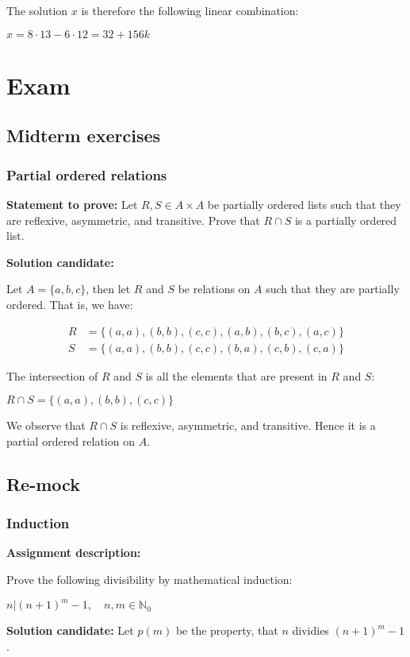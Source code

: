 \documentclass{report}
\newcommand{\cent}[1]{\begin{center}#1\end{center}}
\newcommand{\mAlign}[1]{\begin{align*}#1\end{align*}}
\newcommand{\doubleN}{\mathbb{N}}
\newcommand{\In}{\! \in \!}
\newcommand{\Prove}{\textbf{Statement to prove: }}
\newcommand{\assignmentDescription}{\textbf{Assignment description: }}
\newcommand{\solution}{\textbf{Solution candidate: }}
\begin{document}
 	The solution $x$ is therefore the following linear combination:
 	
 	\cent{$x = 8\cdot 13 - 6 \cdot 12 = 32 + 156k$}
 	
 	\chapter{Exam}
 	\pagebreak
	\section{Midterm exercises}
 	\subsection{Partial ordered relations}
	 
	\Prove
	Let $R,S\In A \times A$ be partially ordered lists such that they are reflexive, asymmetric, and transitive. Prove that $R\cap S$ is a partially ordered list.
	
	\solution
	 
	Let $A=\{a,b,c\}$, then let $R$ and $S$ be relations on $A$ such that they are partially ordered. That is, we have:
	 
	\mAlign{R&=\{(a,a),(b,b),(c,c),(a,b),(b,c),(a,c)\}\\
	 			   S&= \{(a,a),(b,b),(c,c),(b,a),(c,b),(c,a)\}}
	 
	The intersection of $R$ and $S$ is all the elements that are present in $R$ and $S$:
	 
	\cent{$R \cap S = \{(a,a),(b,b),(c,c)\}$}
	 
	We observe that $R \cap S$ is reflexive, asymmetric, and transitive.  Hence it is a partial ordered relation on $A$.
	
	\section{Re-mock}
	
	\subsection{Induction}
	
	\assignmentDescription
	
	Prove the following divisibility by mathematical induction:
	
	\cent{$n|(n+1)^m-1, \quad n,m \In \doubleN_0$}
	
	\solution
	Let $p(m)$ be the property, that  $n$ dividies $(n+1)^m - 1$.\\
	
\end{document}
